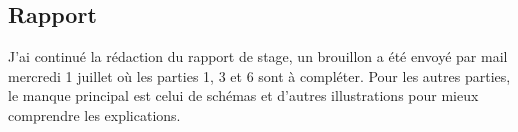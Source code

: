 \documentclass{article}
\begin{document}
\FloatBarrier

\newpage

\subsection{Rapport}

J'ai continué la rédaction du rapport de stage, un brouillon a été envoyé par mail mercredi 1 juillet où 
les parties 1, 3 et 6 sont à compléter. Pour les autres parties, le manque principal est celui de schémas et 
d'autres illustrations pour mieux comprendre les explications. 
\end{document}
